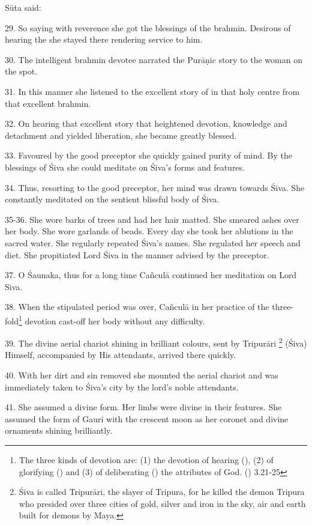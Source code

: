 Sūta said:

29. So saying with reverence she got the blessings of the brahmin. Desirous of
hearing the  she stayed there rendering service to him.

30. The intelligent brahmin devotee narrated the Purāṇic story to the woman on
the spot.

31. In this manner she listened to the excellent story of  in
that holy centre from that excellent brahmin.

32. On hearing that excellent story that heightened devotion, knowledge and
detachment and yielded liberation, she became greatly blessed.

33. Favoured by the good preceptor she quickly gained purity of mind. By the
blessings of Śiva she could meditate on Śiva’s forms and features.

34. Thus, resorting to the good preceptor, her mind was drawn towards Śiva. She
constantly meditated on the sentient blissful body of Śiva.

35-36. She wore barks of trees and had her hair matted. She smeared ashes over
her body. She wore garlands of  beads. Every day she took her
ablutions in the sacred water. She regularly repeated Śiva’s names. She
regulated her speech and diet. She propitiated Lord Śiva in the manner advised
by the preceptor.

37. O Śaunaka, thus for a long time Cañculā continued her meditation on Lord Siva.

38. When the stipulated period was over, Cañculā in her practice of the
three-fold\footnote{The three kinds of devotion are: (1) the devotion of hearing
(), (2) of glorifying () and (3) of deliberating
() the attributes of God.  ()
3.21-25} devotion cast-off her body without any difficulty.

39. The divine aerial chariot shining in brilliant colours, sent by Tripurāri
\footnote{Śiva is called Tripurāri, the slayer of Tripura, for he killed the
demon Tripura who presided over three cities of gold, silver and iron in the sky,
air and earth built for demons by Maya.} (Śiva) Himself, accompanied by His
attendants, arrived there quickly.

40. With her dirt and sin removed she mounted the aerial chariot and was
immediately taken to Śiva’s city by the lord’s noble attendants.

41. She assumed a divine form. Her limbs were divine in their features. She
assumed the form of Gaurī with the crescent moon as her coronet and divine
ornaments shining brilliantly.

